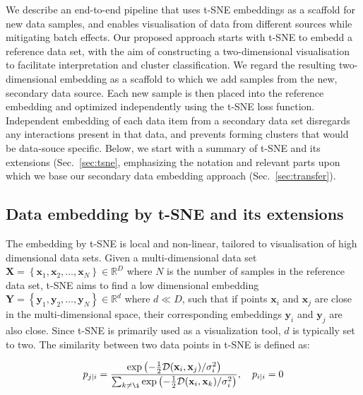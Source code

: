 \documentclass[runningheads]{llncs}
\begin{document}
We describe an end-to-end pipeline that uses t-SNE embeddings as a scaffold for new data samples, and enables visualisation of data from different sources while mitigating batch effects. Our proposed approach starts with t\nobreakdash -SNE to embedd a reference data set, with the aim of constructing a two-dimensional visualisation to facilitate interpretation and cluster classification. We regard the resulting two-dimensional embedding as a scaffold to which we add samples from the new, secondary data source. Each new sample is then placed into the reference embedding and optimized independently using the t\nobreakdash -SNE loss function. Independent embedding of each data item from a secondary data set disregards any interactions present in that data, and prevents forming clusters that would be data-souce specific. Below, we start with a summary of t-SNE and its extensions (Sec.~\ref{sec:tsne}, emphasizing the notation and relevant parts upon which we base our secondary data embedding approach (Sec.~\ref{sec:transfer}).


\subsection{Data embedding by t-SNE and its extensions\label{sec:tsne}}

The embedding by t-SNE is local and non-linear, tailored to visualisation of high dimensional data sets. Given a multi-dimensional data set $\mathbf{X} = \left \{ \mathbf{x}_1, \mathbf{x}_2, \dots, \mathbf{x}_N \right \} \in \mathbb{R}^D$ where $N$ is the number of samples in the reference data set, t-SNE aims to find a low dimensional embedding $\mathbf{Y} = \left \{ \mathbf{y}_1, \mathbf{y}_2, \dots, \mathbf{y}_N \right \} \in \mathbb{R}^d$ where $d \ll D$, such that if points $\mathbf{x}_i$ and $\mathbf{x}_j$ are close in the multi-dimensional space, their corresponding embeddings $\mathbf{y}_i$ and $\mathbf{y}_j$ are also close. Since t-SNE is primarily used as a visualization tool, $d$ is typically set to two. The similarity between two data points in t-SNE is defined as:

\begin{equation}
p_{j \mid i} = \frac{\exp \left ( -\frac{1}{2} \mathcal{D}(\mathbf{x}_i, \mathbf{x}_j ) / \sigma_i^2 \right )}
{\sum_{k \neq \i } \exp \left ( -\frac{1}{2} \mathcal{D}(\mathbf{x}_i, \mathbf{x}_k ) / \sigma_i^2 \right )}, \quad p_{i \mid i} = 0
\label{eq:gaussian_kernel}
\end{equation}
\end{document}
